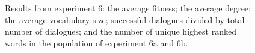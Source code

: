 \begin{figure}[b]\setcounter{subfigure}{0}
    \centering
    \hfill
    \caption[Graphs of the results from experiment 6 as a function of number of generations.]{Results from experiment 6:  the average fitness;  the average degree;  the average vocabulary size;  successful dialogues divided by total number of dialogues; and  the number of unique highest ranked words in the population of experiment 6a and 6b.}
    \label{fig:exp6.0}
\end{figure}
%
